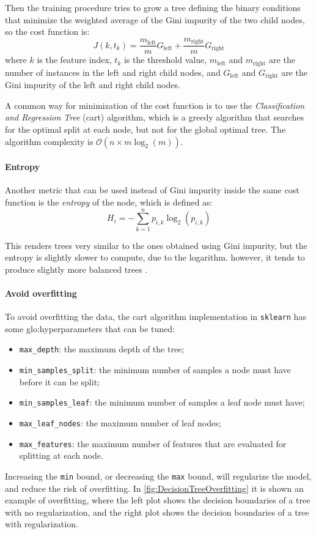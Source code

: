 Then the training procedure tries to grow a tree defining the binary conditions that minimize the weighted average of the Gini impurity of the two child nodes, so the cost function is:
\begin{equation}
    J(k, t_k) = \frac{m_{\text{left}}}{m}G_{\text{left}} + \frac{m_{\text{right}}}{m}G_{\text{right}}
\end{equation}
where $k$ is the feature index, $t_k$ is the threshold value, $m_{\text{left}}$ and $m_{\text{right}}$ are the number of instances in the left and right child nodes, and $G_{\text{left}}$ and $G_{\text{right}}$ are the Gini impurity of the left and right child nodes.

A common way for minimization of the cost function is to use the \emph{Classification and Regression Tree} (\gls{cart}) algorithm, which is a greedy algorithm that searches for the optimal split at each node, but not for the global optimal tree. The algorithm complexity is $\mathcal{O}(n \times m \log_2(m))$.

\paragraph{Entropy}
Another metric that can be used instead of Gini impurity inside the same cost function is the \emph{entropy} of the node, which is defined as:
\begin{equation}
    H_i = - \sum_{k=1}^{n}p_{i,k}\log_2(p_{i,k})
\end{equation}

This renders trees very similar to the ones obtained using Gini impurity, but the entropy is slightly slower to compute, due to the logarithm. however, it tends to produce slightly more balanced trees \cite{raschka2013decisiontrees}.

\paragraph{Avoid overfitting}
To avoid overfitting the data, the \gls{cart} algorithm implementation in \texttt{sklearn} has some \gls{glo:hyperparameter}s that can be tuned:
\begin{itemize}
    \item \texttt{max\_depth}: the maximum depth of the tree;
    \item \texttt{min\_samples\_split}: the minimum number of samples a node must have before it can be split;
    \item \texttt{min\_samples\_leaf}: the minimum number of samples a leaf node must have;
    \item \texttt{max\_leaf\_nodes}: the maximum number of leaf nodes;
    \item \texttt{max\_features}: the maximum number of features that are evaluated for splitting at each node.
\end{itemize}
Increasing the \texttt{min} bound, or decreasing the \texttt{max} bound, will regularize the model, and reduce the risk of overfitting.
In \autoref{fig:DecisionTreeOverfitting} it is shown an example of overfitting, where the left plot shows the decision boundaries of a tree with no regularization, and the right plot shows the decision boundaries of a tree with regularization.

